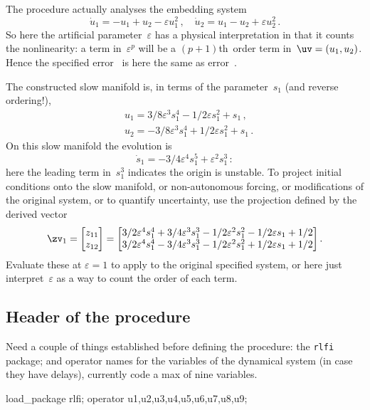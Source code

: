 \documentclass[11pt,a5paper]{article}
\def\eps{\varepsilon}
\begin{document}
The procedure actually analyses the embedding system
\begin{equation*}
\dot u_1=-u_1+u_2-\eps u_1^2\,, \quad \dot u_2=u_1-u_2+\eps u_2^2\,.
\end{equation*}
So here the artificial parameter~\(\eps\) has a physical
interpretation in that it counts the nonlinearity: a term
in~\(\eps^p\) will be a \((p+1)\)th~order term
in~\(\uv=(u_1,u_2)\). Hence the specified error~\Ord{\eps^5}
is here the same as error~.

The constructed slow manifold is, in terms of the
parameter~\(s_1\) (and reverse ordering!), 
\begin{align*}&
u_{1}=3/8 \eps^{3} s_{1}^{4}-1/2 \eps s_{1}^{2}+s_{1}\,,
\\&
u_{2}=-3/8 \eps^{3} s_{1}^{4}+1/2 \eps s_{1}^{2}+s_{1}\,.
\end{align*}
On this slow manifold the evolution is
\begin{equation*}
\dot s_{1}=-3/4 \eps^{4} s_{1}^{5}+\eps^{2} s_{1}^{3}\,:
\end{equation*}
here the leading term in~\(s_1^3\) indicates the origin is
unstable. To project initial conditions onto the slow
manifold, or non-autonomous forcing, or modifications of the
original system, or to quantify uncertainty, use the
projection defined by the derived vector
\begin{equation*}
\zv_1=\begin{bmatrix}z_{11}\\z_{12}\end{bmatrix}
=\begin{bmatrix}
3/2 \eps^{4} s_{1}^{4}+3/4 \eps^{3} s_{1}^{3}-1/2 \eps^{2} s_{1}
^{2}-1/2 \eps s_{1}+1/2
\\
3/2 \eps^{4} s_{1}^{4}-3/4 \eps^{3} s_{1}^{3}-1/2 \eps^{2} s_{1}
^{2}+1/2 \eps s_{1}+1/2
\end{bmatrix}.
\end{equation*}
Evaluate these at \(\eps=1\) to apply to the original
specified system, or here just interpret~\(\eps\) as a way
to count the order of each term.




\subsection{Header of the procedure}

Need a couple of things established before defining the
procedure: the \verb|rlfi| package; and operator names for
the variables of the dynamical system (in case they have
delays), currently code a max of nine variables.
\begin{reduce}
load_package rlfi; 
operator u1,u2,u3,u4,u5,u6,u7,u8,u9;
\end{reduce}
\end{document}
